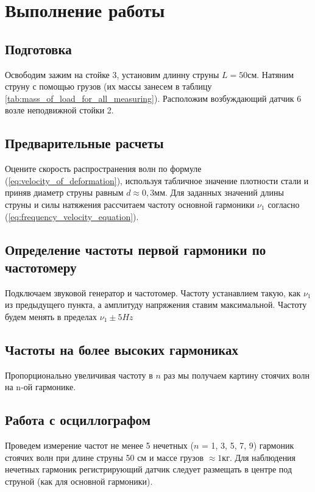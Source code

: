 \documentclass[12pt,a4paper]{article}
\begin{document}
\section{Выполнение работы}


\subsection{Подготовка}
Освободим зажим на стойке 3, установим длинну струны $L=50$см. Натяним струну с помощью грузов (их массы занесем в таблицу \ref{tab:mass_of_load_for_all_measuring}). Расположим возбуждающий датчик 6 возле неподвижной стойки 2.


\subsection{Предварительные расчеты}
Оцените скорость распространения волн по формуле (\ref{eq:velocity_of_deformation}), используя табличное значение плотности стали и приняв диаметр струны равным $d\approx0,3$мм. Для заданных значений длины струны и силы натяжения рассчитаем частоту основной гармоники $\nu_{1}$ согласно (\ref{eq:frequency_velocity_equation}).


\subsection{Определение частоты первой гармоники по частотомеру}
Подключаем звуковой генератор и частотомер. Частоту устанавлием такую, как $\nu_{1}$ из предыдущего пункта, а амплитуду напряжения ставим максимальной. Частоту будем менять в пределах $\nu_{1}\pm5 Hz$


\subsection{Частоты на более высоких гармониках}
Пропорционально увеличивая частоту в $n$ раз мы получаем картину стоячих волн на n-ой гармонике. 


\subsection{Работа с осциллографом}
Проведем измерение частот не менее 5 нечетных ($n$ = 1, 3, 5, 7, 9) гармоник стоячих волн при длине струны 50 см и массе грузов $\approx1$кг. Для наблюдения нечетных гармоник регистрирующий датчик следует размещать в центре под струной (как для основной гармоники).\\
\end{document}
